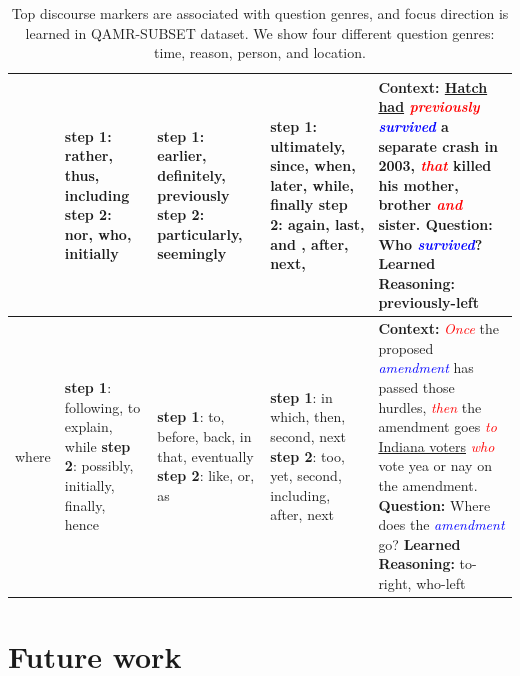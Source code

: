 \begin{table}[t]
{\begin{tabular}{|p{1.8cm}|p{2.5cm}|p{2.5cm}|p{2.5cm}|p{5.8cm}|}
	& \textbf{step 1}: rather, thus, including \newline\newline\textbf{step 2}: nor, who, initially &\textbf{step 1}: earlier, definitely, previously \newline\newline\textbf{step 2}: particularly, seemingly
		&\textbf{step 1}: ultimately, since, when, later, while, finally \newline \textbf{step 2}:  again, last, and , after, next, 
	& \textbf{Context: }\underline{Hatch had} \textit{\textcolor{red}{previously}} \textit{\textcolor{blue}{survived}} a separate crash in 2003, \textit{\textcolor{red}{that}} killed his mother, brother \textit{\textcolor{red}{and}} sister.
  \newline \textbf{Question: }Who \textit{\textcolor{blue}{survived}}?\newline \textbf{Learned Reasoning: }previously-left\\ 
	\hline
  where 
 
  
	 &\textbf{step 1}: following, to explain, while \newline\newline\textbf{step 2}: possibly, initially, finally, hence &\textbf{step 1}: to, before, back, in that, eventually \newline\textbf{step 2}: like, or, as & \textbf{step 1}: in which, then, second, next \newline\newline \textbf{step 2}: too, yet, second, including, after, next
  & \textbf{Context: }\textit{\textcolor{red}{Once}} the proposed \textit{\textcolor{blue}{amendment}} has passed those hurdles, \textit{\textcolor{red}{then}} the amendment goes \textit{\textcolor{red}{to}} \underline{Indiana voters} \textit{\textcolor{red}{who}} vote yea or nay on the amendment. 
  \newline \textbf{Question: }Where does the \textit{\textcolor{blue}{amendment}} go?
  \newline \textbf{Learned Reasoning: }to-right, who-left\\ 
 \hline
\end{tabular}
}
\caption{Top discourse markers are associated with question genres, and focus direction is learned in \textsc{QAMR-SUBSET} dataset. We show four different question genres: time, reason, person, and location.}
\label{tab:disc_phrase}
\end{table}

\section{Future work}

